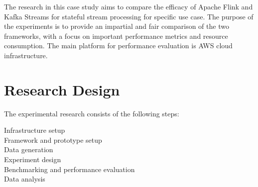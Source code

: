 The research in this case study aims to compare the
efficacy of Apache Flink and Kafka Streams for stateful stream processing for specific use case.
The purpose of the experiments is to provide an impartial
and fair comparison of the two frameworks, with a focus
on important performance metrics and resource consumption.
The main platform for performance evaluation is AWS cloud infrastructure.

\section{Research Design}\label{sec:research-design}



The experimental research consists of the following steps:

\begin{description}
    \item[Infrastructure setup]
    \item[Framework and prototype setup]
    \item[Data generation] 
    \item[Experiment design]
    \item[Benchmarking and performance evaluation]
    \item[Data analysis]
\end{description}